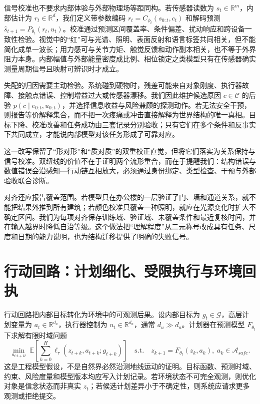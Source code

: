 信号校准也不要求内部体验与外部物理场等距同构。若传感器读数为 $s_t\in\mathbb{R}^{m}$，内部估计为 $r_t\in\mathbb{R}^{d}$，我们定义带参数编码 $r_t=C_{\phi_t}(s_{0:t},c_t)$ 和解码预测 $\widehat s_{t+1}=P_{\theta_t}(r_t,u_t)$。校准通过预测区间覆盖率、条件偏差、扰动响应和跨设备一致性检验。视觉中的“红”可与光谱、照明、表面反射和语言标签共同相关，但不能简化成单一波长；用力感可与关节力矩、触觉反馈和动作副本相关，也不等于外界阻力本身。内部幅值与外部能量密度成比例、相位锁定之类模型只有在传感器确实测量周期信号且映射可辨识时才成立。

失配的归因需要主动检验。系统碰到硬物时，残差可能来自对象刚度、执行器故障、接触点错误、控制增益过大或传感器漂移。我们因此维护候选原因 $c\in\mathcal{C}$ 的后验 $p(c\mid e_{0:t},u_{0:t})$，并选择信息收益与风险兼顾的探测动作。若无法安全干预，则报告等价解释集合，而不把一次疼痛或冲击直接解释为世界结构的唯一真相。目标下降、校准改善和任务成功由三套记录分别验收；只有它们在多个条件和反事实下共同成立，才能说内部模型对该任务形成了可靠对应。

这一改写保留了“形对形”和“质对质”的双重校正直觉，但将它们落实为关系保持与信号校准。双纽线的价值不在于证明两个流形重合，而在于提醒我们：结构错误与数值错误会沿感知—行动链互相放大，必须通过身份绑定、类型检查、干预与外部验收联合诊断。

对齐还应报告覆盖范围。若模型只在办公楼的一层验证了门、墙和通道关系，就不能把结果外推到所有建筑；若颜色校准只覆盖一种照明，就应在光源变化时扩大不确定区间。我们为每项对齐保存训练域、验证域、未覆盖条件和最近复核时间，并在输入越界时降低自治等级。这个做法把“理解程度”从二元称号改成具有任务、尺度和日期的能力说明，也为结构迁移提供了明确的失败信号。

\section{行动回路：计划细化、受限执行与环境回执}
\label{sec:section_1929}

行动回路把内部目标转化为环境中的可观测后果。设内部目标为 $g_t\in\mathcal{G}$，高层计划变量为 $a_t\in\mathbb{R}^{d_a}$，执行器控制为 $u_t\in\mathbb{R}^{d_u}$，通常 $d_u\gg d_a$。计划器在预测模型 $F_{\theta_t}$ 下求解有限时域问题
\[
\min_{a_{t:t+H}}\;\mathbb{E}\!\left[\sum_{k=0}^{H}\ell_\tau(z_{t+k},a_{t+k};g_{t+k})\right]
\quad\text{s.t.}\quad z_{k+1}=F_{\theta_t}(z_k,a_k),\;a_k\in\mathcal{A}_{safe}.
\]
这是工程模型假设，不是自然界必然沿测地线运动的证明。目标函数、预测时域、约束、风险度量和模型版本均应写入计划记录。若环境状态不可完全观测，则优化对象是信念状态而非真实 $z_t$；若候选计划差异小于不确定性，则系统应请求更多观测或拒绝提交。

